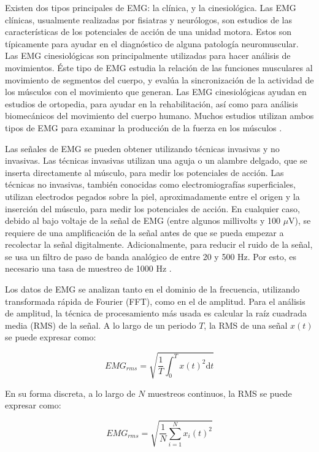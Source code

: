 Existen dos tipos principales de EMG: la clínica, y la cinesiológica. Las EMG clínicas, usualmente realizadas por fisiatras y neurólogos, son estudios de las características de los potenciales de acción de una unidad motora. Estos son típicamente para ayudar en el diagnóstico de alguna patología neuromuscular. Las EMG cinesiológicas son principalmente utilizadas para hacer análisis de movimientos. Éste tipo de EMG estudia la relación de las funciones musculares al movimiento de segmentos del cuerpo, y evalúa la sincronización de la actividad de los músculos con el movimiento que generan. Las EMG cinesiológicas ayudan en estudios de ortopedia, para ayudar en la rehabilitación, así como para análisis biomecánicos del movimiento del cuerpo humano. Muchos estudios utilizan ambos tipos de EMG para examinar la producción de la fuerza en los músculos \citep{rash2003electromyography}.

Las señales de EMG se pueden obtener utilizando técnicas invasivas y no invasivas. Las técnicas invasivas utilizan una aguja o un alambre delgado, que se inserta directamente al músculo, para medir los potenciales de acción. Las técnicas no invasivas, también conocidas como electromiografías superficiales, utilizan electrodos pegados sobre la piel, aproximadamente entre el origen y la inserción del músculo, para medir los potenciales de acción. En cualquier caso, debido al bajo voltaje de la señal de EMG (entre algunos millivolts y 100 $\mu$V), se requiere de una amplificación de la señal antes de que se pueda empezar a recolectar la señal digitalmente. Adicionalmente, para reducir el ruido de la señal, se usa un filtro de paso de banda analógico de entre 20 y 500 Hz. Por esto, es necesario una tasa de muestreo de 1000 Hz \citep{kutz2004standard}. 

Los datos de EMG se analizan tanto en el dominio de la frecuencia, utilizando transformada rápida de Fourier (FFT), como en el de amplitud. Para el análisis de amplitud, la técnica de procesamiento más usada es calcular la raíz cuadrada media (RMS) de la señal. A lo largo de un periodo $T$, la RMS de una señal $x(t)$ se puede expresar como:

\begin{equation}
	EMG_{rms} = \sqrt{\frac{1}{T} \int_0^T x(t)^2 \mathrm{d}t}
\end{equation}

En su forma discreta, a lo largo de $N$ muestreos continuos, la RMS se puede expresar como:

\begin{equation}
	EMG_{rms} = \sqrt{\frac{1}{N} \sum_{i=1}^{N} x_i(t)^2}
\end{equation}

